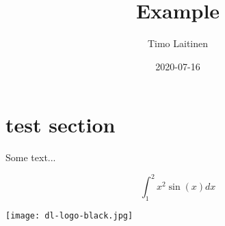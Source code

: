 \documentclass[]{book}
\title{Example}
\author{Timo Laitinen}
\date{2020-07-16}
\begin{document}
\maketitle

\section{test section}


Some text...


\begin{equation}
  \label{#eq:baa}
  \int_1^2 x^2\sin(x) dx
\end{equation}

\texttt{[image: dl-logo-black.jpg]}
\end{document}

